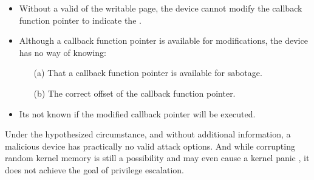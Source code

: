 \begin{itemize}
    \item Without a valid \kva{} of the writable page, the device cannot modify the callback function pointer to indicate the \mabaf.
    \item Although a callback function pointer is available for modifications, the device has no way of knowing: 
    \begin{enumerate}
        \item[(a)] That a callback function pointer is available for sabotage.
        \item[(b)] The correct offset of the callback function pointer.
    \end{enumerate}
    \item Its not known if the modified callback pointer will be executed.
\end{itemize}

Under the hypothesized circumstance, and without additional information, a malicious device has practically no valid attack options. 
And while corrupting random kernel memory is still a possibility and may even cause a kernel panic \cite{MMT16}, it does not achieve the goal of privilege escalation.




